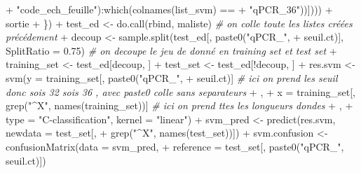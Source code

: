 \documentclass[
  11pt,
  french,
  a4paper,
  extrafontsizes,onecolumn,openright
  ]{memoir}
\newenvironment{Shaded}{\begin{snugshade}}{\end{snugshade}}
\newcommand{\AttributeTok}[1]{\textcolor[rgb]{0.77,0.63,0.00}{#1}}
\newcommand{\CommentTok}[1]{\textcolor[rgb]{0.56,0.35,0.01}{\textit{#1}}}
\newcommand{\FloatTok}[1]{\textcolor[rgb]{0.00,0.00,0.81}{#1}}
\newcommand{\FunctionTok}[1]{\textcolor[rgb]{0.00,0.00,0.00}{#1}}
\newcommand{\NormalTok}[1]{#1}
\newcommand{\OtherTok}[1]{\textcolor[rgb]{0.56,0.35,0.01}{#1}}
\newcommand{\SpecialCharTok}[1]{\textcolor[rgb]{0.00,0.00,0.00}{#1}}
\newcommand{\StringTok}[1]{\textcolor[rgb]{0.31,0.60,0.02}{#1}}
\begin{document}
\begin{Shaded}
\begin{Highlighting}[]
\SpecialCharTok{+}                 \StringTok{"code\_ech\_feuille"}\NormalTok{)}\SpecialCharTok{:}\FunctionTok{which}\NormalTok{(}\FunctionTok{colnames}\NormalTok{(list\_svm) }\SpecialCharTok{==} 
\SpecialCharTok{+}                 \StringTok{"qPCR\_36"}\NormalTok{))])))}
\SpecialCharTok{+}\NormalTok{         sortie}
\SpecialCharTok{+}\NormalTok{     \})}
\SpecialCharTok{+}\NormalTok{     test\_ed }\OtherTok{\textless{}{-}} \FunctionTok{do.call}\NormalTok{(rbind, maliste)  }\CommentTok{\# on colle toute les listes créées précédement }
\SpecialCharTok{+}\NormalTok{     decoup }\OtherTok{\textless{}{-}} \FunctionTok{sample.split}\NormalTok{(test\_ed[, }\FunctionTok{paste0}\NormalTok{(}\StringTok{"qPCR\_"}\NormalTok{, }
\SpecialCharTok{+}\NormalTok{         seuil.ct)], }\AttributeTok{SplitRatio =} \FloatTok{0.75}\NormalTok{)  }\CommentTok{\# on decoupe le jeu de donné en training set et test set}
\SpecialCharTok{+}\NormalTok{     training\_set }\OtherTok{\textless{}{-}}\NormalTok{ test\_ed[decoup, ]}
\SpecialCharTok{+}\NormalTok{     test\_set }\OtherTok{\textless{}{-}}\NormalTok{ test\_ed[}\SpecialCharTok{!}\NormalTok{decoup, ]}
\SpecialCharTok{+}\NormalTok{     res.svm }\OtherTok{\textless{}{-}} \FunctionTok{svm}\NormalTok{(}\AttributeTok{y =}\NormalTok{ training\_set[, }\FunctionTok{paste0}\NormalTok{(}\StringTok{"qPCR\_"}\NormalTok{, }
\SpecialCharTok{+}\NormalTok{         seuil.ct)]  }\CommentTok{\# ici on prend les seuil donc sois 32 sois 36 , avec \textquotesingle{}paste0\textquotesingle{} colle sans separateurs}
\SpecialCharTok{+}\NormalTok{ , }
\SpecialCharTok{+}         \AttributeTok{x =}\NormalTok{ training\_set[, }\FunctionTok{grep}\NormalTok{(}\StringTok{"\^{}X"}\NormalTok{, }\FunctionTok{names}\NormalTok{(training\_set))]  }\CommentTok{\#  ici on prend ttes les longueurs d\textquotesingle{}ondes}
\SpecialCharTok{+}\NormalTok{ , }
\SpecialCharTok{+}         \AttributeTok{type =} \StringTok{"C{-}classification"}\NormalTok{, }\AttributeTok{kernel =} \StringTok{"linear"}\NormalTok{)}
\SpecialCharTok{+}\NormalTok{     svm\_pred }\OtherTok{\textless{}{-}} \FunctionTok{predict}\NormalTok{(res.svm, }\AttributeTok{newdata =}\NormalTok{ test\_set[, }
\SpecialCharTok{+}         \FunctionTok{grep}\NormalTok{(}\StringTok{"\^{}X"}\NormalTok{, }\FunctionTok{names}\NormalTok{(test\_set))])}
\SpecialCharTok{+}\NormalTok{     svm.confusion }\OtherTok{\textless{}{-}} \FunctionTok{confusionMatrix}\NormalTok{(}\AttributeTok{data =}\NormalTok{ svm\_pred, }
\SpecialCharTok{+}         \AttributeTok{reference =}\NormalTok{ test\_set[, }\FunctionTok{paste0}\NormalTok{(}\StringTok{"qPCR\_"}\NormalTok{, seuil.ct)])}

\end{Highlighting}
\end{Shaded}
\end{document}
